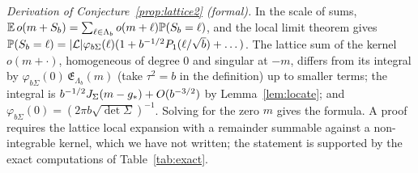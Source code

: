 \noindent\emph{Derivation of Conjecture~\ref{prop:lattice2} (formal).} In the scale of sums,
$\mathbb{E}\,o(m+S_b)=\sum_{\ell\in\Lambda_b}o(m+\ell)\mathbb{P}(S_b=\ell)$, and the local limit theorem gives
$\mathbb{P}(S_b=\ell)=|\mathcal{L}|\varphi_{b\Sigma}(\ell)(1+b^{-1/2}P_1(\ell/\sqrt b)+\dots)$. The lattice sum of the kernel
$o(m+\cdot)$, homogeneous of degree $0$ and singular at $-m$, differs from its integral by
$\varphi_{b\Sigma}(0)\,\mathfrak E_{\Lambda_b}(m)$ (take $\tau^2=b$ in the definition) up to smaller terms; the integral is
$b^{-1/2}J_\Sigma(m-g_\ast)+O(b^{-3/2})$ by Lemma~\ref{lem:locate}; and $\varphi_{b\Sigma}(0)=(2\pi b\sqrt{\det\Sigma})^{-1}$.
Solving for the zero $m$ gives the formula. A proof requires the lattice local expansion with a remainder summable
against a non-integrable kernel, which we have not written; the statement is supported by the exact computations of
Table~\ref{tab:exact}.
